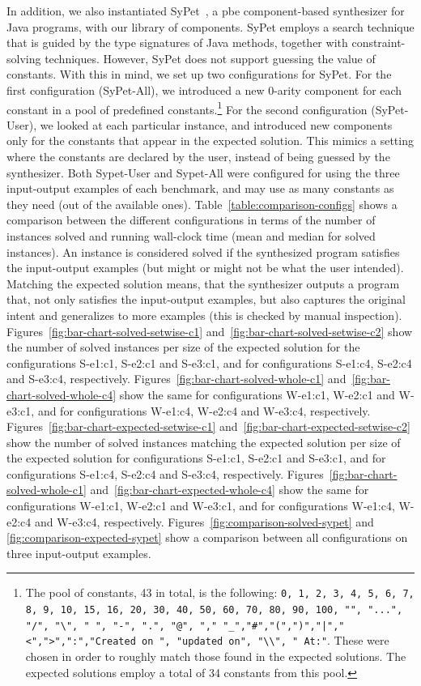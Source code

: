 In addition, we also instantiated SyPet~\cite{Feng:2017:CSC}, a \gls{pbe}
component-based synthesizer for Java programs, with our library of components.
SyPet employs a search technique that is guided by the type signatures of Java
methods, together with constraint-solving techniques.
However, SyPet does not support guessing the value of constants.
With this in mind, we set up two configurations for SyPet.
For the first configuration (SyPet-All), we introduced a new 0-arity component
for each constant in a pool of predefined constants.\footnote{The pool of
constants, 43 in total, is the following: \lstinline{0, 1, 2, 3, 4, 5, 6, 7, 8,
9, 10, 15, 16, 20, 30, 40, 50, 60, 70, 80, 90, 100, "", "...", "/", "\", " ",
"-", ".", "@", "," "_","#","(",")","|","<",">",":","Created on ", "updated on",
"\\", " At:"}. These were chosen in order to roughly match those found in the
expected solutions. The expected solutions employ a total of 34 constants from
this pool.}
For the second configuration (SyPet-User), we looked at each particular
instance, and introduced new components only for the constants that appear in
the expected solution.
This mimics a setting where the constants are declared by the user, instead of
being guessed by the synthesizer.
Both Sypet\nobreakdash-User and Sypet-All were configured for using the three
input-output examples of each benchmark, and may use as many constants as they
need (out of the available ones).
Table~\ref{table:comparison-configs} shows a comparison between the different
configurations in terms of the number of instances solved and running wall-clock
time (mean and median for solved instances).
An instance is considered solved if the synthesized program satisfies the
input-output examples (but might or might not be what the user intended).
Matching the expected solution means, that the synthesizer outputs a program
that, not only satisfies the input-output examples, but also captures the
original intent and generalizes to more examples (this is checked by manual
inspection).
Figures~\ref{fig:bar-chart-solved-setwise-c1}
and~\ref{fig:bar-chart-solved-setwise-c2} show the number of solved instances
per size of the expected solution for the configurations S-e1:c1, S-e2:c1 and
S-e3:c1, and for configurations S-e1:c4, S-e2:c4 and S-e3:c4, respectively.
Figures~\ref{fig:bar-chart-solved-whole-c1}
and~\ref{fig:bar-chart-solved-whole-c4} show the same for configurations
W-e1:c1, W-e2:c1 and W-e3:c1, and for configurations W-e1:c4, W-e2:c4 and
W-e3:c4, respectively.
Figures~\ref{fig:bar-chart-expected-setwise-c1}
and~\ref{fig:bar-chart-expected-setwise-c2} show the number of solved instances
matching the expected solution per size of the expected solution for
configurations S-e1:c1, S-e2:c1 and S-e3:c1, and for configurations
S-e1:c4, S-e2:c4 and S-e3:c4, respectively.
Figures~\ref{fig:bar-chart-solved-whole-c1}
and~\ref{fig:bar-chart-expected-whole-c4} show the same for configurations
W-e1:c1, W-e2:c1 and W-e3:c1, and for configurations W-e1:c4, W-e2:c4 and
W-e3:c4, respectively.
Figures~\ref{fig:comparison-solved-sypet} and
\ref{fig:comparison-expected-sypet} show a comparison between all configurations
on three input-output examples.

